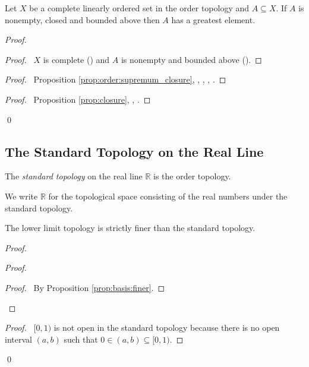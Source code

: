 \begin{prop}
  \label{prop:order:closed_greatest}
  Let $X$ be a complete linearly ordered set in the order topology and $A \subseteq X$. If $A$ is nonempty, closed and bounded above then $A$ has a greatest element.
\end{prop}

\begin{proof}
  \pf
  \begin{proof}
    \pf\ $X$ is complete () and $A$ is nonempty and bounded above ().
  \end{proof}
  \begin{proof}
    \pf\ Proposition \ref{prop:order:supremum_closure}, , , , .
  \end{proof}
  \begin{proof}
    \pf\ Proposition \ref{prop:closure}, , .
  \end{proof}
  \qed
\end{proof}

\subsection{The Standard Topology on the Real Line}

\begin{df}
  The \emph{standard topology} on the real line $\mathbb{R}$ is the order topology.

  We write $\mathbb{R}$ for the topological space consisting of the real numbers under the standard topology.
\end{df}

\begin{prop}
  The lower limit topology is strictly finer than the standard topology.
\end{prop}

\begin{proof}
  \pf
  \begin{proof}
    \step{<2>1}{\pflet{$x \in (a,b)$]}}
    \qedstep
    \begin{proof}
      \pf\ By Proposition \ref{prop:basis:finer}.
    \end{proof}
  \end{proof}
  \begin{proof}
    \pf\ $[0,1)$ is not open in the standard topology because there is no open interval $(a,b)$ such that $0 \in (a,b) \subseteq [0,1)$.
  \end{proof}
  \qed
\end{proof}

